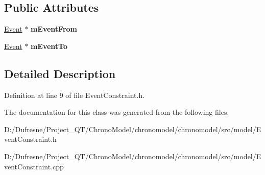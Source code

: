 \subsection*{Public Attributes}
\begin{DoxyCompactItemize}
\item 
\hypertarget{class_event_constraint_a1cdd8230afc7d33efaf979c88afffd67}{\hyperlink{class_event}{Event} $\ast$ {\bfseries m\-Event\-From}}\label{class_event_constraint_a1cdd8230afc7d33efaf979c88afffd67}

\item 
\hypertarget{class_event_constraint_a334c898e05894ad1cf69656f19e26b11}{\hyperlink{class_event}{Event} $\ast$ {\bfseries m\-Event\-To}}\label{class_event_constraint_a334c898e05894ad1cf69656f19e26b11}

\end{DoxyCompactItemize}


\subsection{Detailed Description}


Definition at line 9 of file Event\-Constraint.\-h.



The documentation for this class was generated from the following files\-:\begin{DoxyCompactItemize}
\item 
D\-:/\-Dufresne/\-Project\-\_\-\-Q\-T/\-Chrono\-Model/chronomodel/chronomodel/src/model/Event\-Constraint.\-h\item 
D\-:/\-Dufresne/\-Project\-\_\-\-Q\-T/\-Chrono\-Model/chronomodel/chronomodel/src/model/Event\-Constraint.\-cpp\end{DoxyCompactItemize}
